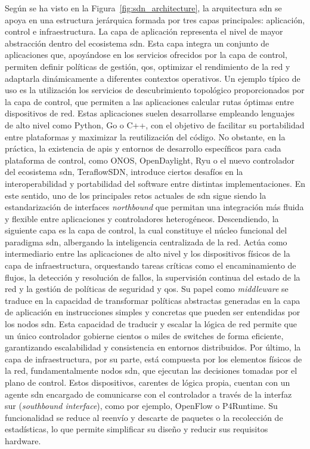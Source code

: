 Según se ha visto en la Figura~\ref{fig:sdn_architecture}, la arquitectura \gls{sdn} se apoya en una estructura jerárquica formada por tres capas principales: aplicación, control e infraestructura. La capa de aplicación representa el nivel de mayor abstracción dentro del ecosistema \gls{sdn}. Esta capa integra un conjunto de aplicaciones que, apoyándose en los servicios ofrecidos por la capa de control, permiten definir políticas de gestión, \gls{qos}, optimizar el rendimiento de la red y adaptarla dinámicamente a diferentes contextos operativos. Un ejemplo típico de uso es la utilización los servicios de descubrimiento topológico proporcionados por la capa de control, que permiten a las aplicaciones calcular rutas óptimas entre dispositivos de red. Estas aplicaciones suelen desarrollarse empleando lenguajes de alto nivel como Python, Go o C++, con el objetivo de facilitar su portabilidad entre plataformas y maximizar la reutilización del código. No obstante, en la práctica, la existencia de \glspl{api} y entornos de desarrollo específicos para cada plataforma de control, como ONOS, OpenDaylight, Ryu o el nuevo controlador del ecosistema \gls{sdn}, TeraflowSDN, introduce ciertos desafíos en la interoperabilidad y portabilidad del software entre distintas implementaciones. En este sentido, uno de los principales retos actuales de \gls{sdn} sigue siendo la estandarización de interfaces \textit{northbound} que permitan una integración más fluida y flexible entre aplicaciones y controladores heterogéneos. Descendiendo, la siguiente capa es la capa de control, la cual constituye el núcleo funcional del paradigma \gls{sdn}, albergando la inteligencia centralizada de la red. Actúa como intermediario entre las aplicaciones de alto nivel y los dispositivos físicos de la capa de infraestructura, orquestando tareas críticas como el encaminamiento de flujos, la detección y resolución de fallos, la supervisión continua del estado de la red y la gestión de políticas de seguridad y \gls{qos}. Su papel como \textit{middleware} se traduce en la capacidad de transformar políticas abstractas generadas en la capa de aplicación en instrucciones simples y concretas que pueden ser entendidas por los nodos \gls{sdn}. Esta capacidad de traducir y escalar la lógica de red permite que un único controlador gobierne cientos o miles de switches de forma eficiente, garantizando escalabilidad y consistencia en entornos distribuidos. Por último, la capa de infraestructura, por su parte, está compuesta por los elementos físicos de la red, fundamentalmente nodos \gls{sdn}, que ejecutan las decisiones tomadas por el plano de control. Estos dispositivos, carentes de lógica propia, cuentan con un agente \gls{sdn} encargado de comunicarse con el controlador a través de la interfaz sur (\textit{southbound interface}), como por ejemplo, OpenFlow o P4Runtime. Su funcionalidad se reduce al reenvío y descarte de paquetes o la recolección de estadísticas, lo que permite simplificar su diseño y reducir sus requisitos hardware.\\
